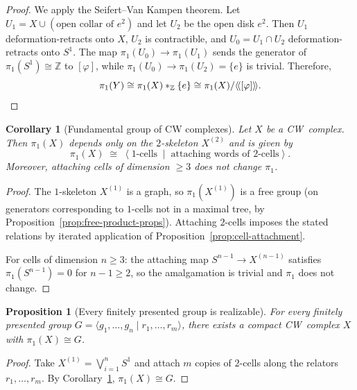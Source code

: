 \documentclass[12pt,a4paper,openany]{book}
\theoremstyle{definition}
\theoremstyle{plain}
\newtheorem{proposition}[definition]{Proposition}
\newtheorem{corollary}[definition]{Corollary}
\theoremstyle{remark}
\newcommand{\Z}{\mathbb{Z}}
\begin{document}
\begin{proof}
  We apply the Seifert--Van Kampen theorem.  Let $U_1 = X \cup
  (\text{open collar of } e^2)$ and let $U_2$ be the open disk $e^2$.  Then
  $U_1$ deformation-retracts onto $X$, $U_2$ is contractible, and
  $U_0 = U_1 \cap U_2$ deformation-retracts onto $S^1$.  The map
  $\pi_1(U_0) \to \pi_1(U_1)$ sends the generator of $\pi_1(S^1) \cong \Z$ to
  $[\varphi]$, while $\pi_1(U_0) \to \pi_1(U_2) = \{e\}$ is trivial.
  Therefore,
  \[
    \pi_1(Y) \cong \pi_1(X) *_\Z \{e\} \cong \pi_1(X) / \langle\!\langle [\varphi] \rangle\!\rangle. \qedhere
  \]
\end{proof}

\begin{corollary}[Fundamental group of CW complexes]\label{cor:pi1-CW}
  Let $X$ be a CW~complex.  Then $\pi_1(X)$ depends only on the $2$-skeleton
  $X^{(2)}$ and is given by
  \[
    \pi_1(X) \;\cong\; \left\langle
      \text{$1$-cells} \;\middle|\; \text{attaching words of $2$-cells}
    \right\rangle.
  \]
  Moreover, attaching cells of dimension $\geq 3$ does not change $\pi_1$.
\end{corollary}

\begin{proof}
  The $1$-skeleton $X^{(1)}$ is a graph, so $\pi_1(X^{(1)})$ is a free group
  (on generators corresponding to $1$-cells not in a maximal tree, by
  Proposition~\ref{prop:free-product-props}).  Attaching $2$-cells imposes
  the stated relations by iterated application of
  Proposition~\ref{prop:cell-attachment}.

  For cells of dimension $n \geq 3$: the attaching map $S^{n-1} \to X^{(n-1)}$
  satisfies $\pi_1(S^{n-1}) = 0$ for $n-1 \geq 2$, so the amalgamation is
  trivial and $\pi_1$ does not change.
\end{proof}

\begin{proposition}[Every finitely presented group is realizable]\label{prop:every-fp-group}
  For every finitely presented group $G = \langle g_1, \ldots, g_n \mid
  r_1, \ldots, r_m \rangle$, there exists a compact CW~complex $X$ with
  $\pi_1(X) \cong G$.
\end{proposition}

\begin{proof}
  Take $X^{(1)} = \bigvee_{i=1}^n S^1$ and attach $m$ copies of $2$-cells
  along the relators $r_1, \ldots, r_m$.  By
  Corollary~\ref{cor:pi1-CW}, $\pi_1(X) \cong G$.
\end{proof}
\end{document}
